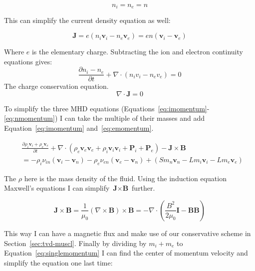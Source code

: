 \documentclass[12pt,upcase]{umlthesis}
\begin{document}
\begin{equation}\label{eq:quasineutrality}
	n_i = n_e = n
\end{equation}

This can simplify the current density equation as well:

\begin{equation}\label{eq:currentdensity}
	\textbf{J} = e ( n_i \textbf{v}_i - n_e \textbf{v}_e) = e n (\textbf{v}_i - \textbf{v}_e)
\end{equation}

Where $e$ is the elementary charge. Subtracting the ion and electron continuity equations gives:
\begin{equation}
	\frac{\partial n_i - n_e}{\partial t} + \nabla\cdot(n_i v_i - n_e v_e) = 0
\end{equation}
The charge conservation equation.
\begin{equation}\label{eq:chargeconservation}
	\nabla\cdot\textbf{J} = 0
\end{equation}


To simplify the three MHD equations (Equations~\ref{eq:imomentum}-\ref{eq:nmomentum}) I can take the multiple of their masses and add Equation~\ref{eq:imomentum} and~\ref{eq:emomentum}.

\begin{equation}\label{eq:singlemomentum}
	\begin{aligned}
		& \frac{\partial \rho_i \textbf{v}_i + \rho_e \textbf{v}_e}{\partial t} + \nabla \cdot (\rho_e \textbf{v}_e \textbf{v}_e + \rho_i \textbf{v}_i \textbf{v}_i + \textbf{P}_i + \textbf{P}_e) - \textbf{J} \times \textbf{B} \\
		& = - \rho_i \nu_{in}(\textbf{v}_i - \textbf{v}_n) - \rho_e \nu_{en} (\textbf{v}_e - \textbf{v}_n)+ (S m_n \textbf{v}_n - L m_i \textbf{v}_i - L m_e \textbf{v}_e)
\end{aligned}
\end{equation}

The $\rho$ here is the mass density of the fluid. Using the induction equation Maxwell's equations I can simplify $\textbf{J} \times \textbf{B}$ further.

\begin{equation}
	\textbf{J} \times \textbf{B} = \frac{1}{\mu_0} (\nabla \times \textbf{B}) \times \textbf{B} = -\nabla \cdot (\frac{B^2}{2\mu_0}\textbf{I} - \textbf{BB})
\end{equation}

This way I can have a magnetic flux and make use of our conservative scheme in Section~\ref{sec:tvd-muscl}. Finally by dividing by $m_i+m_e$ to Equation~\ref{eq:singlemomentum} I can find the center of momentum velocity and simplify the equation one last time:
\end{document}
